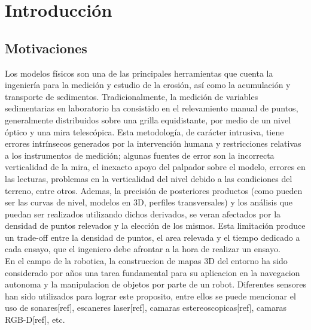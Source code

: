 \chapter{Introducci\'{o}n}

\section{Motivaciones}
\label{S:motivaciones}

Los modelos f\'{i}sicos son una de las principales herramientas que cuenta la ingenier\'{i}a para la medici\'{o}n y estudio de la erosi\'{o}n, as\'{i} como la acumulaci\'{o}n y transporte de sedimentos.
Tradicionalmente, la medici\'{o}n de variables sedimentarias en laboratorio ha consistido en el relevamiento manual de puntos, generalmente distribuidos sobre una grilla equidistante, por medio de un nivel \'{o}ptico y una mira telesc\'{o}pica.
Esta metodolog\'{i}a, de car\'{a}cter intrusiva, tiene errores intr\'{i}nsecos generados por la intervenci\'{o}n humana y restricciones relativas a los instrumentos de medici\'{o}n; algunas fuentes de error son la incorrecta verticalidad de la mira, el inexacto apoyo del palpador sobre el modelo, errores en las lecturas, problemas en la verticalidad del nivel debido a las condiciones del terreno, entre otros.
Ademas, la precisi\'{o}n de posteriores productos (como pueden ser las curvas de nivel, modelos en 3D, perfiles transversales) y los an\'{a}lisis que puedan ser realizados utilizando dichos derivados, se veran afectados por la densidad de puntos relevados y la elecci\'{o}n de los mismos. Esta limitaci\'{o}n produce un trade-off entre la densidad de puntos, el area relevada y el tiempo dedicado a cada ensayo, que el ingeniero debe afrontar a la hora de realizar un ensayo. \\

En el campo de la robotica, la construccion de mapas 3D del entorno ha sido considerado por a\~{n}os una tarea fundamental para su aplicacion en la navegacion autonoma y la manipulacion de objetos por parte de un robot. Diferentes sensores han sido utilizados para lograr este proposito, entre ellos se puede mencionar el uso de sonares[ref], escaneres laser[ref], camaras estereoscopicas[ref], camaras RGB-D[ref], etc. 

